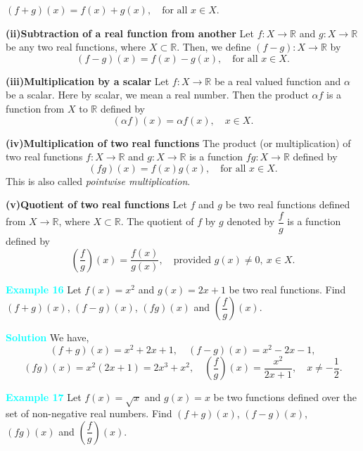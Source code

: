 \documentclass[11pt]{article}
\begin{document}
$(f+g)(x) = f(x) + g(x), \quad \text{for all } x \in X$.

\medskip

\noindent
\textbf{(ii)\quad Subtraction of a real function from another}  
Let $f : X \to \mathbb{R}$ and $g : X \to \mathbb{R}$ be any two real
functions, where $X \subset \mathbb{R}$. Then, we define
$(f-g) : X \to \mathbb{R}$ by
\[
(f-g)(x) = f(x) - g(x), \quad \text{for all } x \in X.
\]

\medskip

\noindent
\textbf{(iii)\quad Multiplication by a scalar}  
Let $f : X \to \mathbb{R}$ be a real valued function and $\alpha$ be a
scalar. Here by scalar, we mean a real number. Then the product
$\alpha f$ is a function from $X$ to $\mathbb{R}$ defined by
\[
(\alpha f)(x) = \alpha f(x), \quad x \in X.
\]

\medskip

\noindent
\textbf{(iv)\quad Multiplication of two real functions}  
The product (or multiplication) of two real functions
$f : X \to \mathbb{R}$ and $g : X \to \mathbb{R}$ is a function
$fg : X \to \mathbb{R}$ defined by
\[
(fg)(x) = f(x) g(x), \quad \text{for all } x \in X.
\]
This is also called \emph{pointwise multiplication}.

\medskip

\noindent
\textbf{(v)\quad Quotient of two real functions}  
Let $f$ and $g$ be two real functions defined from
$X \to \mathbb{R}$, where $X \subset \mathbb{R}$. The quotient of $f$ by
$g$ denoted by $\dfrac{f}{g}$ is a function defined by
\[
\left(\frac{f}{g}\right)(x) = \frac{f(x)}{g(x)}, \quad
\text{provided } g(x) \neq 0,\ x \in X.
\]

\medskip

\noindent\textcolor{cyan}{\textbf{Example 16}}  
Let $f(x) = x^{2}$ and $g(x) = 2x + 1$ be two real functions.
Find $(f+g)(x)$, $(f-g)(x)$, $(fg)(x)$ and
$\left(\dfrac{f}{g}\right)(x)$.

\medskip

\noindent\textcolor{cyan}{\textbf{Solution}}  
We have,
\[
(f+g)(x) = x^{2} + 2x + 1,
\quad
(f-g)(x) = x^{2} - 2x - 1,
\]
\[
(fg)(x) = x^{2}(2x+1) = 2x^{3} + x^{2},
\quad
\left(\frac{f}{g}\right)(x) = \frac{x^{2}}{2x+1},
\quad x \neq -\frac{1}{2}.
\]

\medskip

\noindent\textcolor{cyan}{\textbf{Example 17}}  
Let $f(x) = \sqrt{x}$ and $g(x) = x$ be two functions defined over the set
of non-negative real numbers. Find $(f+g)(x)$, $(f-g)(x)$, $(fg)(x)$ and
$\left(\dfrac{f}{g}\right)(x)$.
\end{document}
